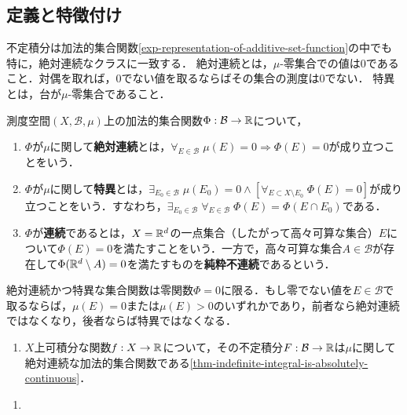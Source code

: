 \documentclass[uplatex, dvipdfmx]{jsreport}
\renewcommand{\B}{\mathcal{B}}
\begin{document}
\subsection{定義と特徴付け}

\begin{tcolorbox}[colframe=ForestGreen, colback=ForestGreen!10!white,breakable,colbacktitle=ForestGreen!40!white,coltitle=black,fonttitle=\bfseries\sffamily,
title=]
    不定積分は加法的集合関数\ref{exp-representation-of-additive-set-function}の中でも特に，絶対連続なクラスに一致する．
    絶対連続とは，$\mu$-零集合での値は$0$であること．対偶を取れば，$0$でない値を取るならばその集合の測度は$0$でない．
    特異とは，台が$\mu$-零集合であること．
\end{tcolorbox}

\begin{definition}
    測度空間$(X,\B,\mu)$上の加法的集合関数$\Phi:\B\to\R$について，
    \begin{enumerate}
        \item $\Phi$が$\mu$に関して\textbf{絶対連続}とは，$\forall_{E\in\B}\;\mu(E)=0\Rightarrow\Phi(E)=0$が成り立つことをいう．
        \item $\Phi$が$\mu$に関して\textbf{特異}とは，$\exists_{E_0\in\B}\;\mu(E_0)=0\land[\forall_{E\subset X\setminus E_0}\;\Phi(E)=0]$が成り立つことをいう．すなわち，$\exists_{E_0\in\B}\;\forall_{E\in\B}\;\Phi(E)=\Phi(E\cap E_0)$である．
        \item $\Phi$が\textbf{連続}であるとは，$X=\mathbb{R}^d$の一点集合（したがって高々可算な集合）$E$について$\Phi(E)=0$を満たすことをいう．一方で，高々可算な集合$A\in\B$が存在して$\Phi(\mathbb{R}^d\setminus A)=0$を満たすものを\textbf{純粋不連続}であるという．
    \end{enumerate}
\end{definition}
\begin{remark}
    絶対連続かつ特異な集合関数は零関数$\Phi=0$に限る．もし零でない値を$E\in\B$で取るならば，$\mu(E)=0$または$\mu(E)>0$のいずれかであり，前者なら絶対連続ではなくなり，後者ならば特異ではなくなる．
\end{remark}
\begin{example}[絶対連続な加法的集合関数]\mbox{}\label{exp-absolutely-continuous-set-functions}
    \begin{enumerate}
        \item $X$上可積分な関数$f:X\to\mathbb{R}$について，その不定積分$F:\B\to\R$は$\mu$に関して絶対連続な加法的集合関数である\ref{thm-indefinite-integral-is-absolutely-continuous}．
    \end{enumerate}
\end{example}
\begin{example}[特異な加法的集合関数]\mbox{}
    \begin{enumerate}
        \item 
    \end{enumerate}
\end{example}
\end{document}

